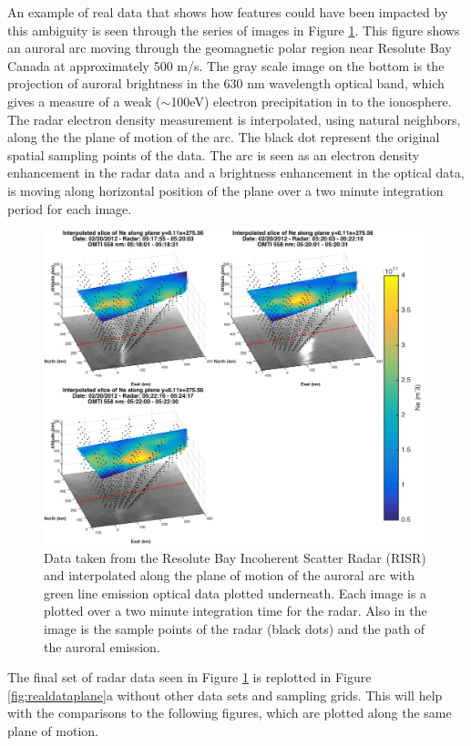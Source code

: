 An example of real data that shows how features could have been impacted by this ambiguity is seen through the series of images in Figure \ref{fig:realdataplane3points}. This figure shows an auroral arc moving through the geomagnetic polar region near Resolute Bay Canada at approximately 500 m/s. The gray scale image on the bottom is the projection of auroral brightness in the 630 nm wavelength optical band, which gives a measure of a weak ($\sim$100eV) electron precipitation in to the ionosphere. The radar electron density measurement is interpolated, using natural neighbors, along the the plane of motion of the arc. The black dot represent the original spatial sampling points of the data. The arc is seen as an electron density enhancement in the radar data and a brightness enhancement in the optical data, is moving along horizontal position of the plane over a two minute integration period for each image. 

\begin{figure}[htb]
	\centering
	\includegraphics[width=5in]{radarwithoptical}
	\caption{Data taken from the Resolute Bay Incoherent Scatter Radar (RISR) and interpolated along the plane of motion of the auroral arc with green line emission optical data plotted underneath. Each image is a plotted over a two minute integration time for the radar. Also in the image is the sample points of the radar (black dots) and the path of the auroral emission. }
	\label{fig:realdataplane3points}
\end{figure}

The final set of radar data seen in Figure \ref{fig:realdataplane3points} is replotted in Figure \ref{fig:realdataplane}a without other data sets and sampling grids. This will help with the comparisons to the following figures, which are plotted along the same plane of motion.

